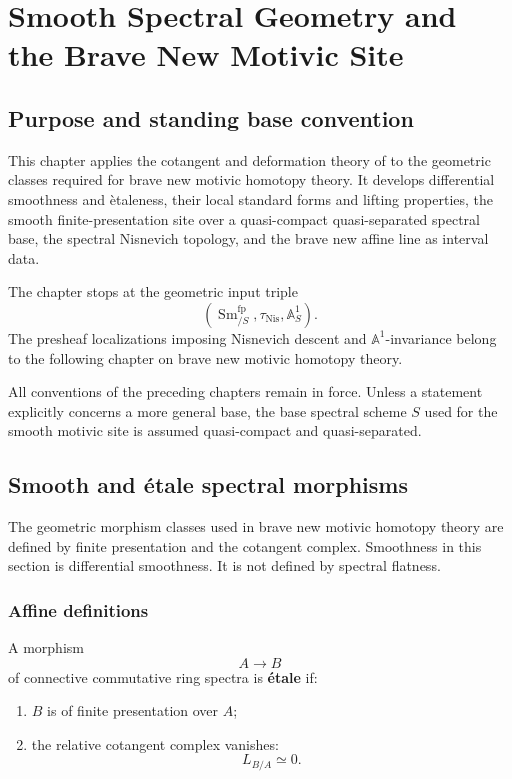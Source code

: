 \chapter{Smooth Spectral Geometry and the Brave New Motivic Site}
\label{chap:smooth-spectral-motivic-site}

\section{Purpose and standing base convention}
\label{sec:smooth-spectral-purpose}

This chapter applies the cotangent and deformation theory of
 to the geometric classes required
for brave new motivic homotopy theory. It develops differential smoothness
and \`etaleness, their local standard forms and lifting properties, the
smooth finite-presentation site over a quasi-compact quasi-separated
spectral base, the spectral Nisnevich topology, and the brave new affine
line as interval data.

The chapter stops at the geometric input triple
\[
    \left(
        \operatorname{Sm}^{\mathrm{fp}}_{/S},
        \tau_{\mathrm{Nis}},
        \mathbb A^1_S
    \right).
\]
The presheaf localizations imposing Nisnevich descent and
$\mathbb A^1$-invariance belong to the following chapter on brave new
motivic homotopy theory.

All conventions of the preceding chapters remain in force. Unless a
statement explicitly concerns a more general base, the base spectral
scheme $S$ used for the smooth motivic site is assumed quasi-compact and
quasi-separated.

\section{Smooth and \texorpdfstring{\'{e}tale}{etale} spectral morphisms}
\label{sec:smooth-etale-spectral-morphisms}

The geometric morphism classes used in brave new motivic homotopy theory
are defined by finite presentation and the cotangent complex. Smoothness in
this section is differential smoothness. It is not defined by spectral
flatness.

\subsection{Affine definitions}

\begin{definition}
\label{def:etale-spectral-algebra}
A morphism
\[
    A
    \longrightarrow
    B
\]
of connective commutative ring spectra is \textbf{\'{e}tale} if:
\begin{enumerate}[label=(\roman*)]
    \item $B$ is of finite presentation over $A$;

    \item the relative cotangent complex vanishes:
    \[
        L_{B/A}
        \simeq
        0.
    \]
\end{enumerate}
\end{definition}

